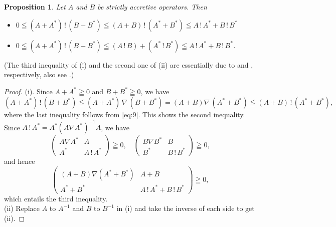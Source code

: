 \documentclass[reqno]{amsart}
\newtheorem{proposition}[theorem]{Proposition}
\theoremstyle{definition}
\theoremstyle{remark}
\begin{document}
\begin{proposition}\label{Prop:5-1}
Let $A$ and $B$ be strictly accretive operators. Then 
\begin{itemize}
\item[(i)]
$0\leqq (A+A^*)\, !\, (B+B^*) \leqq (A+B)\, !\, (A^* + B^*) \leqq A \,!\, A^* + B\, !\, B^*$ \\
\item[(ii)]
$0\leqq (A+A^*)\, !\, (B+B^*) \leqq (A \,!\, B) +  (A^* \,! \, B^*) \leqq A \,!\, A^* + B\, !\, B^*$.
 \end{itemize}
\end{proposition}
(The third inequality of (i) and the second one of (ii) are essentially due to \cite{Mathias} and 
\cite{Lin}, respectively, also see \cite{RMF}.)
\begin{proof}
(i).  Since $A + A^* \geqq 0$ and $B + B^* \geqq 0$, 
we have  
 $$(A+A^*)\, !\, (B+B^*) \leqq  (A+A^*)\,\nabla \, (B+B^*)=  (A+B)\nabla\, (A^* + B^*)
 \leqq (A+B)\, !\, (A^* + B^*),$$
where the last inequality follows from \eqref{eq:9}. 
This shows the second inequality. 
 Since $A\,!\, A^* = A^* (A\nabla A^*)^{-1} A$, we have  
$$\begin{pmatrix}A\nabla A^* & A\\ A^* & A\, !\,  A^* \end{pmatrix} \geqq 0, \quad 
\begin{pmatrix}B\nabla B^* & B\\ B^* & B\, !\,  B^* \end{pmatrix} \geqq 0,$$
and hence 
$$ \begin{pmatrix}(A + B)\nabla (A^* +B^*)  & A + B \\ A^*+ B^*  & A\, !\,  A^* + 
B \, !\,  B^* 
\end{pmatrix} \geqq 0,$$ 
 which entails the third inequality.\\
(ii)
Replace $A$ to $A^{-1}$ and $B$ to $B^{-1}$ in (i) and take the inverse of 
each side to get (ii). 
\end{proof} 
\end{document}
